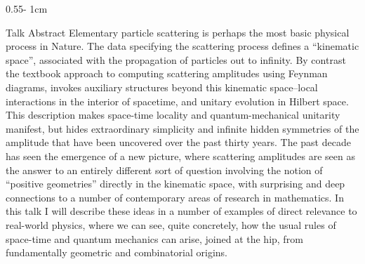 \documentclass{../psuposter}
\begin{document}
\begin{frame}
\begin{columns}[onlytextwidth]
\begin{column}{0.55\textwidth - 1cm}
    \begin{block}{Talk Abstract}
        Elementary particle scattering is perhaps the most basic physical process in Nature. The data specifying the scattering process defines a ``kinematic space'', associated with the propagation of particles out to infinity. By contrast the textbook approach to computing scattering amplitudes using Feynman diagrams, invokes auxiliary structures beyond this kinematic space--local interactions in the interior of spacetime, and unitary evolution in Hilbert space. This description makes space-time locality and quantum-mechanical unitarity manifest, but hides extraordinary simplicity and infinite hidden symmetries of the amplitude that have been uncovered over the past thirty years. The past decade has seen the emergence of a new picture, where scattering amplitudes are seen as the answer to an entirely different sort of question involving  the notion of ``positive geometries'' directly in the kinematic space, with surprising and deep connections to a number of contemporary areas of research in mathematics. In this talk I will describe these ideas in a number of examples of direct relevance to real-world physics, where we can see, quite concretely, how the usual rules of space-time and quantum mechanics can arise, joined at the hip, from fundamentally geometric and combinatorial origins.
    \end{block}


\end{column}
\end{columns}
\end{frame}
\end{document}
